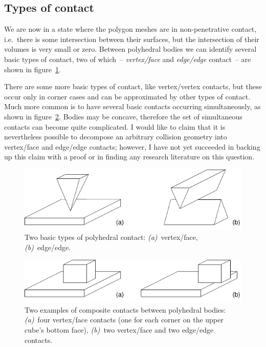 \subsection{Types of contact}

We are now in a state where the polygon meshes are in non-penetrative contact, i.e.\ there is some
intersection between their surfaces, but the intersection of their volumes is very small or zero.
Between polyhedral bodies we can identify several basic types of contact, two of which~--
\emph{vertex/face} and \emph{edge/edge} contact~-- are shown in figure~\ref{contacts1Figure}.

There are some more basic types of contact, like vertex/vertex contacts, but these occur only in
corner cases and can be approximated by other types of contact. Much more common is to have
several basic contacts occurring simultaneously, as shown in figure~\ref{contacts2Figure}. Bodies
may be concave, therefore the set of simultaneous contacts can become quite complicated. I would
like to claim that it is nevertheless possible to decompose an arbitrary collision geometry into
vertex/face and edge/edge contacts; however, I have not yet succeeded in backing up this claim
with a proof or in finding any research literature on this question.

\begin{figure}
\centerline{\includegraphics{figures/contacts1}}
\caption{Two basic types of polyhedral contact: \emph{(a)}~vertex/face, \emph{(b)}~edge/edge.
    \label{contacts1Figure}}
\end{figure}

\begin{figure}
\centerline{\includegraphics{figures/contacts2}}
\caption{Two examples of composite contacts between polyhedral bodies:
    \emph{(a)}~four vertex/face contacts (one for each corner on the upper cube's bottom face),
    \emph{(b)}~two vertex/face and two edge/edge contacts.
    \label{contacts2Figure}}
\end{figure}


